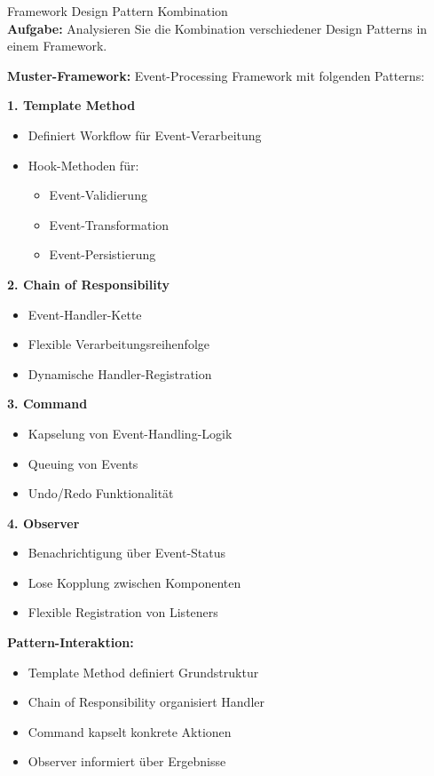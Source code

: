 \columnbreak

\begin{example2}{Framework Design Pattern Kombination}\\
\textbf{Aufgabe:} 
Analysieren Sie die Kombination verschiedener Design Patterns in einem Framework.

\textbf{Muster-Framework:}
Event-Processing Framework mit folgenden Patterns:

\textbf{1. Template Method}
\begin{itemize}
    \item Definiert Workflow für Event-Verarbeitung
    \item Hook-Methoden für:
    \begin{itemize}
        \item Event-Validierung
        \item Event-Transformation
        \item Event-Persistierung
    \end{itemize}
\end{itemize}

\textbf{2. Chain of Responsibility}
\begin{itemize}
    \item Event-Handler-Kette
    \item Flexible Verarbeitungsreihenfolge
    \item Dynamische Handler-Registration
\end{itemize}

\textbf{3. Command}
\begin{itemize}
    \item Kapselung von Event-Handling-Logik
    \item Queuing von Events
    \item Undo/Redo Funktionalität
\end{itemize}

\textbf{4. Observer}
\begin{itemize}
    \item Benachrichtigung über Event-Status
    \item Lose Kopplung zwischen Komponenten
    \item Flexible Registration von Listeners
\end{itemize}

\textbf{Pattern-Interaktion:}
\begin{itemize}
    \item Template Method definiert Grundstruktur
    \item Chain of Responsibility organisiert Handler
    \item Command kapselt konkrete Aktionen
    \item Observer informiert über Ergebnisse
\end{itemize}
\end{example2}

